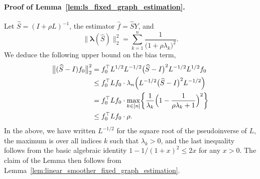 \documentclass[twoside]{article}
\newcommand{\1}{\mathbf{1}}
\newcommand{\lambdavec}{\boldsymbol{\lambda}}
\newcommand{\Lap}{L}
\newcommand{\Id}{I}
\newcommand{\wh}[1]{\widehat{#1}}
\theoremstyle{definition}
\theoremstyle{remark}
\begin{document}
\paragraph{Proof of Lemma~\ref{lem:ls_fixed_graph_estimation}.}
Let $\wh{S} = (\Id + \rho \Lap)^{-1}$, the estimator $\wh{f} = \wh{S}Y$, and
\begin{equation*}
\bigl\|\lambdavec(\wh{S})\bigr\|_2^2 = \sum_{k = 1}^{n} \frac{1}{\bigl(1 + \rho \lambda_k\bigr)^2}.
\end{equation*} 
We deduce the following upper bound on the bias term,
\begin{equation*}
\begin{aligned}
\bigl\|(\wh{S} - I)f_0\bigr\|_2^2 & = f_0^{\top} \Lap^{1/2} \Lap^{-1/2}\bigl(\wh{S} - \Id\bigr)^2 \Lap^{-1/2} \Lap^{1/2} f_0 \\
& \leq f_0^{\top} \Lap f_0 \cdot \lambda_n\Bigl(\Lap^{-1/2}\bigl(\wh{S} - \Id\bigr)^2 \Lap^{-1/2}\Bigr) \\
& = f_0^{\top} \Lap f_0 \cdot \max_{k \in [n]} \biggl\{\frac{1}{\lambda_k} \Bigl(1 - \frac{1}{\rho\lambda_k + 1}\Bigr)^2 \biggr\} \\
& \leq f_0^{\top} \Lap f_0 \cdot \rho.
\end{aligned}
\end{equation*} 
In the above, we have written $\Lap^{-1/2}$ for the square root of the pseudoinverse of $\Lap$, the maximum is over all indices $k$ such that $\lambda_k > 0$, and the last inequality follows from the basic algebraic identity $1 - 1/(1 + x)^2 \leq 2 x$ for any $x > 0$. The claim of the Lemma then follows from Lemma~\ref{lem:linear_smoother_fixed_graph_estimation}.
\end{document}
